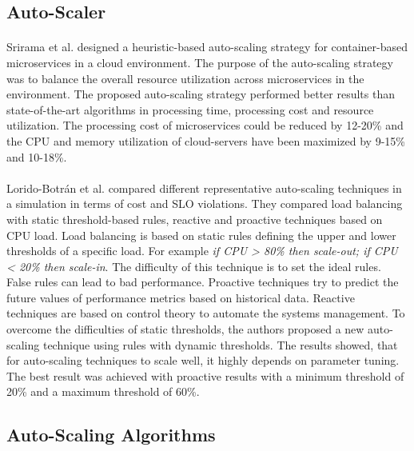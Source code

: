 \subsection{Auto-Scaler}
\paragraph{}
Srirama et al. \citep{Srirama2020AppDeplyCont} designed a heuristic-based auto-scaling strategy for container-based microservices in a cloud environment. The purpose of the auto-scaling strategy was to balance the overall resource utilization across microservices in the environment.
The proposed auto-scaling strategy performed better results than state-of-the-art algorithms in processing time, processing cost and resource utilization. The processing cost of microservices could be reduced by 12-20\% and the CPU and memory utilization of cloud-servers have been maximized by 9-15\% and 10-18\%.


\paragraph{}
Lorido-Botrán et al.  \cite{Botran2013AutoScalingComp} compared different representative auto-scaling techniques in a simulation in terms of cost and SLO violations. They compared load balancing with static threshold-based rules, reactive and proactive techniques based on CPU load.
Load balancing is based on static rules defining the upper and lower thresholds of a specific load. For example \textit{if CPU > 80\% then scale-out; if CPU < 20\% then scale-in}. The difficulty of this technique is to set the ideal rules. False rules can lead to bad performance. Proactive techniques try to predict the future values of performance metrics based on historical data. Reactive techniques are based on control theory to automate the systems management. To overcome the difficulties of static thresholds, the authors proposed a new auto-scaling technique using rules with dynamic thresholds. The results showed, that for auto-scaling techniques to scale well, it highly depends on parameter tuning. The best result was achieved with proactive results with a minimum threshold of 20\% and a maximum threshold of 60\%.


\subsection{Auto-Scaling Algorithms}
